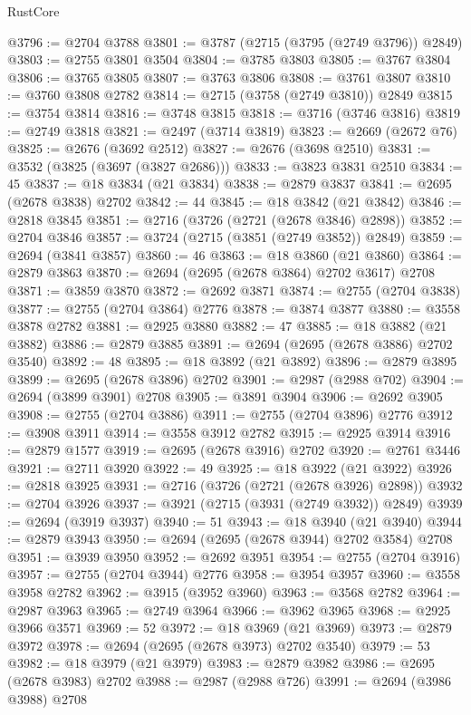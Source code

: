 \begin{lexlean}{RustCore}
\begin{coremodule}
@3796 := @2704 @3788
@3801 := @3787 (@2715 (@3795 (@2749 @3796)) @2849)
@3803 := @2755 @3801 @3504
@3804 := @3785 @3803
@3805 := @3767 @3804
@3806 := @3765 @3805
@3807 := @3763 @3806
@3808 := @3761 @3807
@3810 := @3760 @3808 @2782
@3814 := @2715 (@3758 (@2749 @3810)) @2849
@3815 := @3754 @3814
@3816 := @3748 @3815
@3818 := @3716 (@3746 @3816)
@3819 := @2749 @3818
@3821 := @2497 (@3714 @3819)
@3823 := @2669 (@2672 @76)
@3825 := @2676 (@3692 @2512)
@3827 := @2676 (@3698 @2510)
@3831 := @3532 (@3825 (@3697 (@3827 @2686)))
@3833 := @3823 @3831 @2510
@3834 := 45
@3837 := @18 @3834 (@21 @3834)
@3838 := @2879 @3837
@3841 := @2695 (@2678 @3838) @2702
@3842 := 44
@3845 := @18 @3842 (@21 @3842)
@3846 := @2818 @3845
@3851 := @2716 (@3726 (@2721 (@2678 @3846) @2898))
@3852 := @2704 @3846
@3857 := @3724 (@2715 (@3851 (@2749 @3852)) @2849)
@3859 := @2694 (@3841 @3857)
@3860 := 46
@3863 := @18 @3860 (@21 @3860)
@3864 := @2879 @3863
@3870 := @2694 (@2695 (@2678 @3864) @2702 @3617) @2708
@3871 := @3859 @3870
@3872 := @2692 @3871
@3874 := @2755 (@2704 @3838)
@3877 := @2755 (@2704 @3864) @2776
@3878 := @3874 @3877
@3880 := @3558 @3878 @2782
@3881 := @2925 @3880
@3882 := 47
@3885 := @18 @3882 (@21 @3882)
@3886 := @2879 @3885
@3891 := @2694 (@2695 (@2678 @3886) @2702 @3540)
@3892 := 48
@3895 := @18 @3892 (@21 @3892)
@3896 := @2879 @3895
@3899 := @2695 (@2678 @3896) @2702
@3901 := @2987 (@2988 @702)
@3904 := @2694 (@3899 @3901) @2708
@3905 := @3891 @3904
@3906 := @2692 @3905
@3908 := @2755 (@2704 @3886)
@3911 := @2755 (@2704 @3896) @2776
@3912 := @3908 @3911
@3914 := @3558 @3912 @2782
@3915 := @2925 @3914
@3916 := @2879 @1577
@3919 := @2695 (@2678 @3916) @2702
@3920 := @2761 @3446
@3921 := @2711 @3920
@3922 := 49
@3925 := @18 @3922 (@21 @3922)
@3926 := @2818 @3925
@3931 := @2716 (@3726 (@2721 (@2678 @3926) @2898))
@3932 := @2704 @3926
@3937 := @3921 (@2715 (@3931 (@2749 @3932)) @2849)
@3939 := @2694 (@3919 @3937)
@3940 := 51
@3943 := @18 @3940 (@21 @3940)
@3944 := @2879 @3943
@3950 := @2694 (@2695 (@2678 @3944) @2702 @3584) @2708
@3951 := @3939 @3950
@3952 := @2692 @3951
@3954 := @2755 (@2704 @3916)
@3957 := @2755 (@2704 @3944) @2776
@3958 := @3954 @3957
@3960 := @3558 @3958 @2782
@3962 := @3915 (@3952 @3960)
@3963 := @3568 @2782
@3964 := @2987 @3963
@3965 := @2749 @3964
@3966 := @3962 @3965
@3968 := @2925 @3966 @3571
@3969 := 52
@3972 := @18 @3969 (@21 @3969)
@3973 := @2879 @3972
@3978 := @2694 (@2695 (@2678 @3973) @2702 @3540)
@3979 := 53
@3982 := @18 @3979 (@21 @3979)
@3983 := @2879 @3982
@3986 := @2695 (@2678 @3983) @2702
@3988 := @2987 (@2988 @726)
@3991 := @2694 (@3986 @3988) @2708

\end{coremodule}
\end{lexlean}
